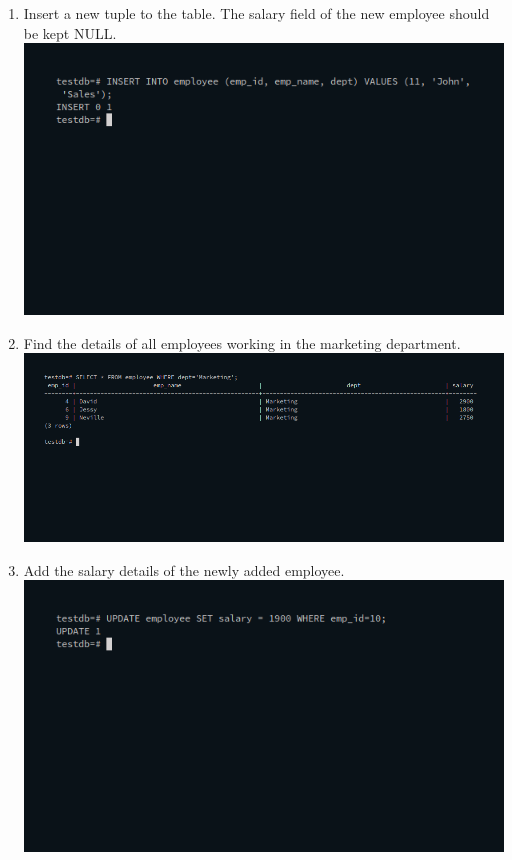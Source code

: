 \documentclass[10pt,a4paper,titlepage]{report}
\begin{document}
{\begin{enumerate}
		\item Insert a new tuple to the table. The salary field of the new employee should be kept NULL.\newline
			\includegraphics[width=\linewidth]{../Images/Basics/4.png}\newline
		\item Find the details of all employees working in the marketing department.\newline
			\includegraphics[width=\linewidth]{../Images/Basics/5.png}\newline
		\item Add the salary details of the newly added employee.\newline
			\includegraphics[width=\linewidth]{../Images/Basics/6.png}\newline

\end{enumerate}}
\end{document}

